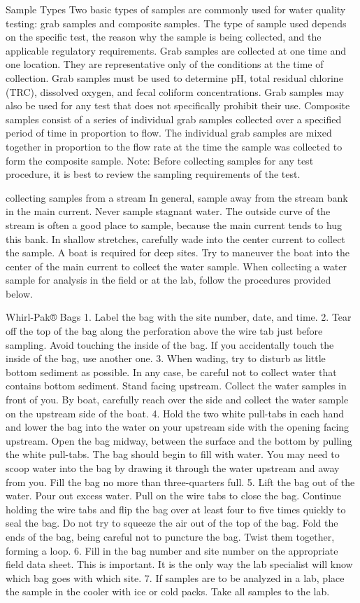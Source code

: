 \documentclass{article}
\begin{document}
Sample Types Two basic types of samples are commonly used for water
quality testing: grab samples and composite samples. The type of sample
used depends on the specific test, the reason why the sample is being
collected, and the applicable regulatory requirements. Grab samples are
collected at one time and one location. They are representative only of
the conditions at the time of collection. Grab samples must be used to
determine pH, total residual chlorine (TRC), dissolved oxygen, and fecal
coliform concentrations. Grab samples may also be used for any test that
does not specifically prohibit their use. Composite samples consist of a
series of individual grab samples collected over a specified period of
time in proportion to flow. The individual grab samples are mixed
together in proportion to the flow rate at the time the sample was
collected to form the composite sample. Note: Before collecting samples
for any test procedure, it is best to review the sampling requirements
of the test.

collecting samples from a stream In general, sample away from the stream
bank in the main current. Never sample stagnant water. The outside curve
of the stream is often a good place to sample, because the main current
tends to hug this bank. In shallow stretches, carefully wade into the
center current to collect the sample. A boat is required for deep sites.
Try to maneuver the boat into the center of the main current to collect
the water sample. When collecting a water sample for analysis in the
field or at the lab, follow the procedures provided below.

Whirl-Pak® Bags 1. Label the bag with the site number, date, and time.
2. Tear off the top of the bag along the perforation above the wire tab
just before sampling. Avoid touching the inside of the bag. If you
accidentally touch the inside of the bag, use another one. 3. When
wading, try to disturb as little bottom sediment as possible. In any
case, be careful not to collect water that contains bottom sediment.
Stand facing upstream. Collect the water samples in front of you. By
boat, carefully reach over the side and collect the water sample on the
upstream side of the boat. 4. Hold the two white pull-tabs in each hand
and lower the bag into the water on your upstream side with the opening
facing upstream. Open the bag midway, between the surface and the bottom
by pulling the white pull-tabs. The bag should begin to fill with water.
You may need to scoop water into the bag by drawing it through the water
upstream and away from you. Fill the bag no more than three-quarters
full. 5. Lift the bag out of the water. Pour out excess water. Pull on
the wire tabs to close the bag. Continue holding the wire tabs and flip
the bag over at least four to five times quickly to seal the bag. Do not
try to squeeze the air out of the top of the bag. Fold the ends of the
bag, being careful not to puncture the bag. Twist them together, forming
a loop. 6. Fill in the bag number and site number on the appropriate
field data sheet. This is important. It is the only way the lab
specialist will know which bag goes with which site. 7. If samples are
to be analyzed in a lab, place the sample in the cooler with ice or cold
packs. Take all samples to the lab.
\end{document}
